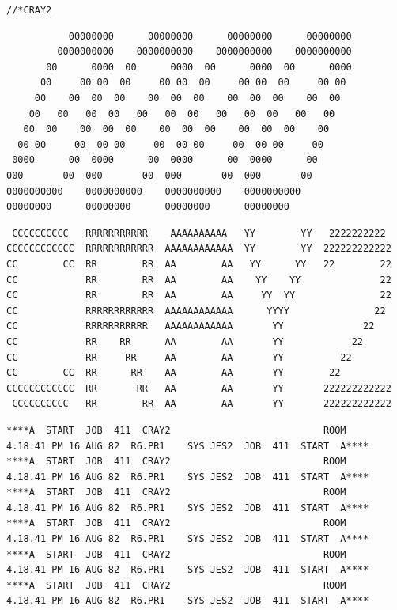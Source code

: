 
\texttt{//*\quad CRAY2\qquad {}}

{\scriptsize
\begin{verbatim}
           00000000      00000000      00000000      00000000
         0000000000    0000000000    0000000000    0000000000
       00      0000  00      0000  00      0000  00      0000
      00     00 00  00     00 00  00     00 00  00     00 00
     00    00  00  00    00  00  00    00  00  00    00  00
    00   00   00  00   00   00  00   00   00  00   00   00
   00  00    00  00  00    00  00  00    00  00  00    00
  00 00     00  00 00     00  00 00     00  00 00     00
 0000      00  0000      00  0000      00  0000      00
000       00  000       00  000       00  000       00
0000000000    0000000000    0000000000    0000000000
00000000      00000000      00000000      00000000
\end{verbatim}
}

{\scriptsize
\begin{verbatim}
 CCCCCCCCCC   RRRRRRRRRRR    AAAAAAAAAA   YY        YY   2222222222
CCCCCCCCCCCC  RRRRRRRRRRRR  AAAAAAAAAAAA  YY        YY  222222222222
CC        CC  RR        RR  AA        AA   YY      YY   22        22
CC            RR        RR  AA        AA    YY    YY              22
CC            RR        RR  AA        AA     YY  YY               22
CC            RRRRRRRRRRRR  AAAAAAAAAAAA      YYYY               22
CC            RRRRRRRRRRR   AAAAAAAAAAAA       YY              22
CC            RR    RR      AA        AA       YY            22
CC            RR     RR     AA        AA       YY          22
CC        CC  RR      RR    AA        AA       YY        22
CCCCCCCCCCCC  RR       RR   AA        AA       YY       222222222222
 CCCCCCCCCC   RR        RR  AA        AA       YY       222222222222
\end{verbatim}
}

{\fontsize{4.5}{5.9}\selectfont
\begin{verbatim}
****A  START  JOB  411  CRAY2                           ROOM        4.18.41 PM 16 AUG 82  R6.PR1    SYS JES2  JOB  411  START  A****
****A  START  JOB  411  CRAY2                           ROOM        4.18.41 PM 16 AUG 82  R6.PR1    SYS JES2  JOB  411  START  A****
****A  START  JOB  411  CRAY2                           ROOM        4.18.41 PM 16 AUG 82  R6.PR1    SYS JES2  JOB  411  START  A****
****A  START  JOB  411  CRAY2                           ROOM        4.18.41 PM 16 AUG 82  R6.PR1    SYS JES2  JOB  411  START  A****
****A  START  JOB  411  CRAY2                           ROOM        4.18.41 PM 16 AUG 82  R6.PR1    SYS JES2  JOB  411  START  A****
****A  START  JOB  411  CRAY2                           ROOM        4.18.41 PM 16 AUG 82  R6.PR1    SYS JES2  JOB  411  START  A****
\end{verbatim}
}

